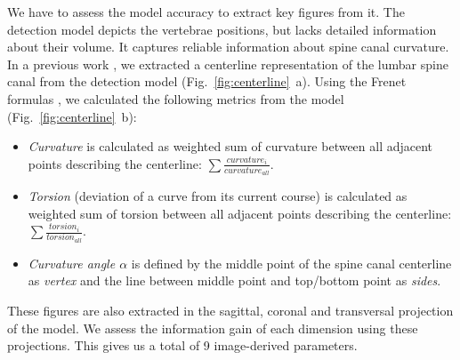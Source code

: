 \documentclass[a4paper,twoside]{style/article}
\newcommand{\com}[1]{\textcolor{orange}{\uline{#1}}}
\begin{document}
We have to assess the model accuracy to extract key figures from it.
The detection model depicts the vertebrae positions, but lacks detailed information about their volume.
It captures reliable information about spine canal curvature.
In a previous work \cite{Klemm2013VMV}, we extracted a centerline representation of the lumbar spine canal from the detection model (Fig.~\ref{fig:centerline}~a).
Using the Frenet formulas \cite{Frenet}, we calculated the following metrics from the model (Fig.~\ref{fig:centerline}~b):
\begin{itemize}
	\item \emph{Curvature} is calculated as weighted sum of curvature between all adjacent points describing the centerline: $\sum \frac{curvature_i}{curvature_{all}}$.
	\item \emph{Torsion} (deviation of a curve from its current course) is calculated as weighted sum of torsion between all adjacent points describing the centerline: $\sum \frac{torsion_i}{torsion_{all}}$.
	\item \emph{Curvature angle $\alpha$} is defined by the middle point of the spine canal centerline as \emph{vertex} and the line between middle point and top/bottom point as \emph{sides}.
\end{itemize}
These figures are also extracted in the sagittal, coronal and transversal projection of the model.
We assess the information gain of each dimension using these projections.
This gives us a total of 9 image-derived parameters.


\end{document}
